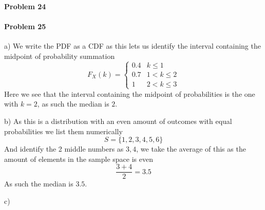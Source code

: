 \paragraph{Problem 24}
\paragraph{Problem 25}
a)
We write the PDF as a CDF as this lets us identify the interval containing the midpoint of probability summation
\[
    F_{X}(k)=\begin{cases}0.4 & k\leq 1 \\ 0.7 & 1<k\leq 2 \\ 1 & 2<k\leq 3\end{cases}
\]
Here we see that the interval containing the midpoint of probabilities is the one with $k=2$, as such the median is $2$.

b)
As this is a distribution with an even amount of outcomes with equal probabilities we list them numerically
\[
    S=\{1,2,3,4,5,6\}
\]
And identify the 2 middle numbers as $3,4$, we take the average of this as the amount of elements in the sample space is even
\[
    \frac{3+4}{2}=3.5
\]
As such the median is $3.5$.

c)
